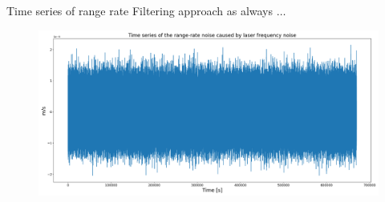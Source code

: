 \documentclass[12pt,english,ignorenonframetext,]{beamer}
\begin{document}
\begin{frame}{Time series of range rate}
	Filtering approach as always $\dots$
	\begin{figure}
		\includegraphics{..//images//filtered_range_rate.png}
	\end{figure}
\end{frame}
\end{document}
